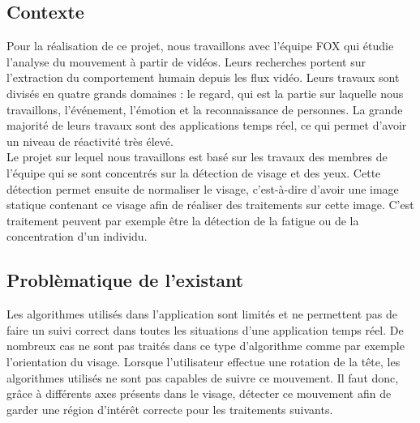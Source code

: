 \subsection{Contexte}
Pour la réalisation de ce projet, nous travaillons avec l'équipe FOX qui étudie
l'analyse du mouvement à partir de vidéos. Leurs recherches portent
sur l'extraction du comportement humain depuis les flux vidéo.  Leurs travaux sont
divisés en quatre grands domaines : le regard, qui est la partie sur laquelle nous travaillons, l'événement, l'émotion et la
reconnaissance de personnes. La grande majorité de leurs travaux sont
des applications temps réel, ce qui permet d'avoir un niveau de réactivité très élevé.\\ 

Le projet sur lequel nous travaillons est basé sur les travaux des membres de l'équipe qui se sont concentrés sur la
détection de visage et des yeux. Cette détection permet ensuite de normaliser le visage, c'est-à-dire
d'avoir une image statique contenant ce visage afin de réaliser des traitements sur cette image. C'est
traitement peuvent par exemple être la détection de la fatigue ou de la concentration d'un individu.


\subsection{Problèmatique de l'existant}
Les algorithmes utilisés dans l'application sont limités et ne permettent pas de faire un suivi correct
dans toutes les situations d'une application temps réel. De nombreux cas ne sont
pas traités dans ce type d'algorithme comme par exemple l'orientation du visage. Lorsque
l'utilisateur effectue une rotation de la tête, les algorithmes utilisés ne sont pas capables
de suivre ce mouvement. Il faut donc, grâce à différents axes présents dans le visage, détecter
ce mouvement afin de garder une région d'intérêt correcte pour les traitements suivants.\\

